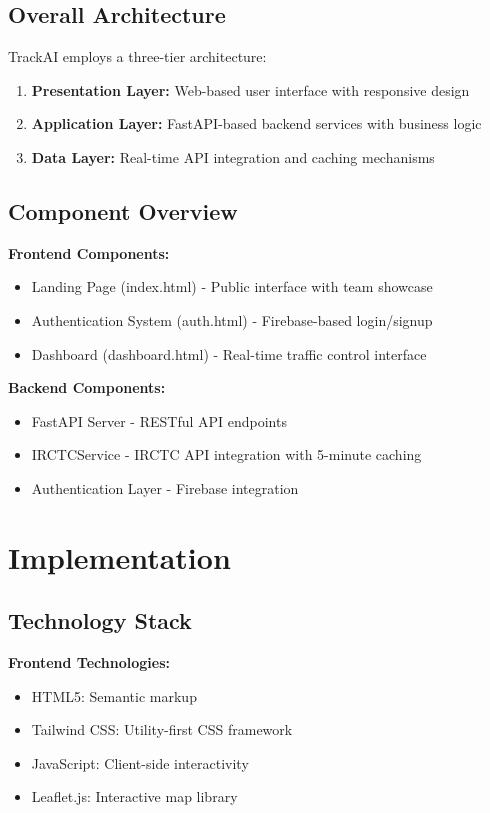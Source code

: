 \documentclass[12pt,a4paper]{article}
\begin{document}
\subsection{Overall Architecture}

TrackAI employs a three-tier architecture:

\begin{enumerate}
    \item \textbf{Presentation Layer:} Web-based user interface with responsive design
    \item \textbf{Application Layer:} FastAPI-based backend services with business logic
    \item \textbf{Data Layer:} Real-time API integration and caching mechanisms
\end{enumerate}

\subsection{Component Overview}

\textbf{Frontend Components:}
\begin{itemize}
    \item Landing Page (index.html) - Public interface with team showcase
    \item Authentication System (auth.html) - Firebase-based login/signup
    \item Dashboard (dashboard.html) - Real-time traffic control interface
\end{itemize}

\textbf{Backend Components:}
\begin{itemize}
    \item FastAPI Server - RESTful API endpoints
    \item IRCTCService - IRCTC API integration with 5-minute caching
    \item Authentication Layer - Firebase integration
\end{itemize}

\section{Implementation}

\subsection{Technology Stack}

\textbf{Frontend Technologies:}
\begin{itemize}
    \item HTML5: Semantic markup
    \item Tailwind CSS: Utility-first CSS framework
    \item JavaScript: Client-side interactivity
    \item Leaflet.js: Interactive map library
\end{itemize}
\end{document}
